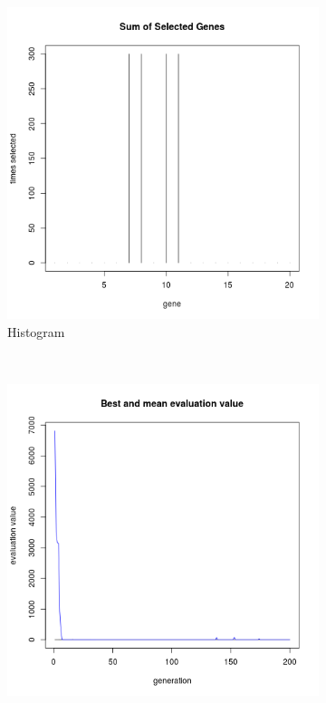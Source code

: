 \documentclass{llncs}
\begin{document}
\begin{figure}[H]
        \centering
        \begin{subfigure}[b]{0.5\textwidth}
                \includegraphics[width=\textwidth]{img/hist_big}
                \caption{Histogram}
                \label{fig:gull}
        \end{subfigure}%
        ~ %
        \begin{subfigure}[b]{0.5\textwidth}
                \includegraphics[width=\textwidth]{img/plot_big}

\end{subfigure}
\end{figure}
\end{document}
